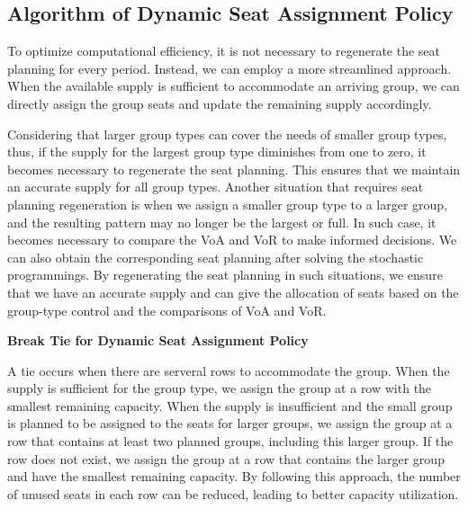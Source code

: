 \subsection{Algorithm of Dynamic Seat Assignment Policy}
To optimize computational efficiency, it is not necessary to regenerate the seat planning for every period. Instead, we can employ a more streamlined approach. When the available supply is sufficient to accommodate an arriving group, we can directly assign the group seats and update the remaining supply accordingly.

Considering that larger group types can cover the needs of smaller group types, thus, if the supply for the largest group type diminishes from one to zero, it becomes necessary to regenerate the seat planning. This ensures that we maintain an accurate supply for all group types.
Another situation that requires seat planning regeneration is when we assign a smaller group type to a larger group, and the resulting pattern may no longer be the largest or full. In such case, it becomes necessary to compare the VoA and VoR to make informed decisions. We can also obtain the corresponding seat planning after solving the stochastic programmings. By regenerating the seat planning in such situations, we ensure that we have an accurate supply and can give the allocation of seats based on the group-type control and the comparisons of VoA and VoR.




{\bf{Break Tie for Dynamic Seat Assignment Policy}}

A tie occurs when there are serveral rows to accommodate the group. When the supply is sufficient for the group type, we assign the group at a row with the smallest remaining capacity. 
When the supply is insufficient and the small group is planned to be assigned to the seats for larger groups, we assign the group at a row that contains at least two planned groups, including this larger group. If the row does not exist, we assign the group at a row that contains the larger group and have the smallest remaining capacity.
By following this approach, the number of unused seats in each row can be reduced, leading to better capacity utilization.



